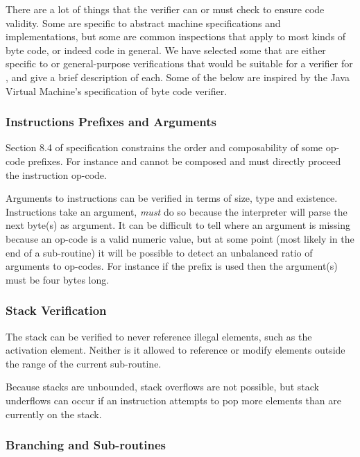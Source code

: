 There are a lot of things that the verifier can or must check to ensure code
validity. Some are specific to abstract machine specifications and
implementations, but some are common inspections that apply to most kinds of
byte code, or indeed code in general. We have selected some that are either
specific to \thename{} or general-purpose verifications that would be suitable
for a verifier for \thename{}, and give a brief description of each. Some of the
below are inspired by the Java Virtual Machine's specification of byte code
verifier\cite{jvm-spec}.


\subsubsection{Instructions Prefixes and Arguments}

Section 8.4 of \thename{} specification constrains the order and composability
of some op-code prefixes. For instance  and  cannot be
composed and  must directly proceed the instruction op-code.

Arguments to instructions can be verified in terms of size, type and
existence. Instructions take an argument, \emph{must} do so because the
interpreter will parse the next byte(s) as argument. It can be difficult to tell
where an argument is missing because an op-code is a valid numeric value, but at
some point (most likely in the end of a sub-routine) it will be possible to
detect an unbalanced ratio of arguments to op-codes. For instance if the
 prefix is used then the argument(s) must be four bytes long.

\subsubsection{Stack Verification}

The stack can be verified to never reference illegal elements, such as the
activation element. Neither is it allowed to reference or modify elements
outside the range of the current sub-routine.

Because stacks are unbounded, stack overflows are not possible, but stack
underflows can occur if an instruction attempts to pop more elements than are
currently on the stack.

\subsubsection{Branching and Sub-routines}
\label{sec:separate-components:verifier:branch}

